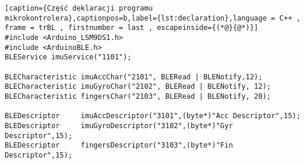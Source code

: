 \begin{lstlisting}[caption={Część deklaracji programu mikrokontrolera},captionpos=b,label={lst:declaration},language = C++ , frame = trBL , firstnumber = last , escapeinside={(*@}{@*)}]
#include <Arduino_LSM9DS1.h>
#include <ArduinoBLE.h>
BLEService imuService("1101");

BLECharacteristic imuAccChar("2101", BLERead | BLENotify,12);
BLECharacteristic imuGyroChar("2102", BLERead | BLENotify, 12);
BLECharacteristic fingersChar("2103", BLERead | BLENotify, 20);

BLEDescriptor     imuAccDescriptor("3101",(byte*)"Acc Descriptor",15);
BLEDescriptor     imuGyroDescriptor("3102",(byte*)"Gyr Descriptor",15);
BLEDescriptor     fingersDescriptor("3103",(byte*)"Fin Descriptor",15);
\end{lstlisting}
 
